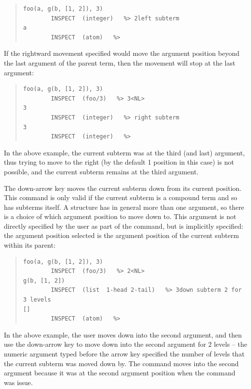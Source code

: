 \begin{descr}{1cm}
\begin{quote}\begin{verbatim}
foo(a, g(b, [1, 2]), 3)
        INSPECT  (integer)   %> 2left subterm
a
        INSPECT  (atom)   %> 
\end{verbatim}\end{quote}

If the rightward movement specified would move the argument position beyond
the last argument of the parent term, then the movement will stop at the
last argument:

\begin{quote}\begin{verbatim}
foo(a, g(b, [1, 2]), 3)
        INSPECT  (foo/3)   %> 3<NL>
3
        INSPECT  (integer)   %> right subterm
3
        INSPECT  (integer)   %> 
\end{verbatim}\end{quote}

In the above example, the current subterm was at the third (and last)
argument, thus trying to move to the right (by the default 1 position in
this case) is not possible, and the current subterm remains at the third
argument. 



The down-arrow key moves the current subterm down from its current
position. This command is only valid if the current subterm is a compound
term and so has subterms itself. A structure has in general more than one
argument, so there is a choice of which argument position to move down to. 
This argument is not directly specified by the user as part of the command,
but is implicitly specified:
the argument position selected is the argument position of the current
subterm within its parent: 
\begin{quote}\begin{verbatim}
foo(a, g(b, [1, 2]), 3)
        INSPECT  (foo/3)   %> 2<NL>
g(b, [1, 2])
        INSPECT  (list  1-head 2-tail)   %> 3down subterm 2 for 3 levels
[]
        INSPECT  (atom)   %> 
\end{verbatim}\end{quote}

In the above example, the user moves down into the second argument, and
then use the down-arrow key to move down into the second argument for 2
levels -- the numeric argument typed before the arrow key specified the
number of levels that the current subterm was moved down by.
The command moves into the second argument because it was at the
second argument position when the command was issue. 


\end{descr}
